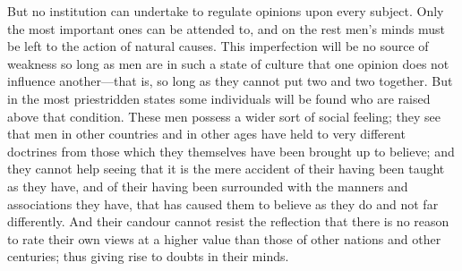 But no institution can undertake to regulate opinions upon every
subject. Only the most important ones can be attended to, and on the
rest men's minds must be left to the action of natural causes. This
imperfection will be no source of weakness so long as men are in such
a state of culture that one opinion does not influence
an\-oth\-er---that is, so long as they cannot put two and two
together. But in the most priestridden states some individuals will be
found who are raised above that condition. These men possess a wider
sort of social  feeling; they see that men in other countries
and in other ages have held to very different doctrines from those
which they themselves have been brought up to believe; and they cannot
help seeing that it is the mere accident of their having been taught
as they have, and of their having been surrounded with the manners and
associations they have, that has caused them to believe as they do and
not far differently. And their candour cannot resist the reflection
that there is no reason to rate their own views at a higher value than
those of other nations and other centuries; thus giving rise to doubts
in their minds.


